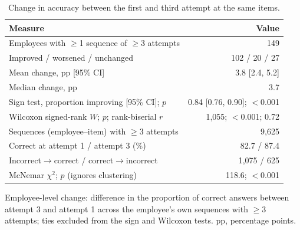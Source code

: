 \begin{table}[htbp]
\centering
\caption{Change in accuracy between the first and third attempt at the same items.}
\label{tab:employee_change}
\small
\begin{tabular}{lr}
\toprule
Measure & Value \\
\midrule
Employees with $\geq$1 sequence of $\geq$3 attempts & 149 \\
Improved / worsened / unchanged & 102 / 20 / 27 \\
Mean change, pp [95\% CI] & 3.8 [2.4, 5.2] \\
Median change, pp & 3.7 \\
Sign test, proportion improving [95\% CI]; $p$ & 0.84 [0.76, 0.90]; $<$0.001 \\
Wilcoxon signed-rank $W$; $p$; rank-biserial $r$ & 1,055; $<$0.001; 0.72 \\
\midrule
Sequences (employee--item) with $\geq$3 attempts & 9,625 \\
Correct at attempt 1 / attempt 3 (\%) & 82.7 / 87.4 \\
Incorrect$\to$correct / correct$\to$incorrect & 1,075 / 625 \\
McNemar $\chi^2$; $p$ (ignores clustering) & 118.6; $<$0.001 \\
\bottomrule
\end{tabular}

\vspace{2pt}
\parbox{\linewidth}{\footnotesize Employee-level change: difference in the proportion of correct answers between attempt 3 and attempt 1 across the employee's own sequences with $\geq$3 attempts; ties excluded from the sign and Wilcoxon tests. pp, percentage points.}
\end{table}

